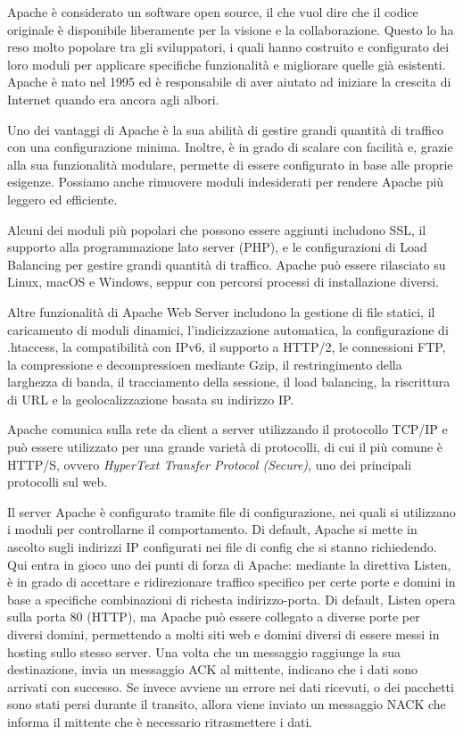 Apache è considerato un software open source, il che vuol dire che il codice originale è disponibile liberamente per la visione e la collaborazione. Questo lo ha reso molto popolare tra gli sviluppatori, i quali hanno costruito e configurato dei loro moduli per applicare specifiche funzionalità e migliorare quelle già esistenti. Apache è nato nel 1995 ed è responsabile di aver aiutato ad iniziare la crescita di Internet quando era ancora agli albori.

Uno dei vantaggi di Apache è la sua abilità di gestire grandi quantità di traffico con una configurazione minima. Inoltre, è in grado di scalare con facilità e, grazie alla sua funzionalità modulare, permette di essere configurato in base alle proprie esigenze. Possiamo anche rimuovere moduli indesiderati per rendere Apache più leggero ed efficiente.

Alcuni dei moduli più popolari che possono essere aggiunti includono SSL, il supporto alla programmazione lato server (PHP), e le configurazioni di Load Balancing per gestire grandi quantità di traffico. Apache può essere rilasciato su Linux, macOS e Windows, seppur con percorsi processi di installazione diversi.

Altre funzionalità di Apache Web Server includono la gestione di file statici, il caricamento di moduli dinamici, l'indicizzazione automatica, la configurazione di .htaccess, la compatibilità con IPv6, il supporto a HTTP/2, le connessioni FTP, la compressione e decompressioen mediante Gzip, il restringimento della larghezza di banda, il tracciamento della sessione, il load balancing, la riscrittura di URL e la geolocalizzazione basata su indirizzo IP.

Apache comunica sulla rete da client a server utilizzando il protocollo TCP/IP e può essere utilizzato per una grande varietà di protocolli, di cui il più comune è HTTP/S, ovvero \textit{HyperText Transfer Protocol (Secure)}, uno dei principali protocolli sul web.

Il server Apache è configurato tramite file di configurazione, nei quali si utilizzano i moduli per controllarne il comportamento. Di default, Apache si mette in ascolto sugli indirizzi IP configurati nei file di config che si stanno richiedendo. Qui entra in gioco uno dei punti di forza di Apache: mediante la direttiva Listen, è in grado di accettare e ridirezionare traffico specifico per certe porte e domini in base a specifiche combinazioni di richesta indirizzo-porta. Di default, Listen opera sulla porta 80 (HTTP), ma Apache può essere collegato a diverse porte per diversi domini, permettendo a molti siti web e domini diversi di essere messi in hosting sullo stesso server. 
Una volta che un messaggio raggiunge la sua destinazione, invia un messaggio ACK al mittente, indicano che i dati sono arrivati con successo. Se invece avviene un errore nei dati ricevuti, o dei pacchetti sono stati persi durante il transito, allora viene inviato un messaggio NACK che informa il mittente che è necessario ritrasmettere i dati.

